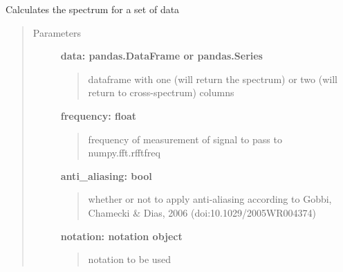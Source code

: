 \documentclass[a4paper,10pt,english]{sphinxmanual}
\begin{document}
\begin{fulllineitems}
\label{pymicra:pymicra.data.crossSpectra}
Calculates the spectrum for a set of data
\begin{quote}\begin{description}
\item[{Parameters}] \leavevmode
\textbf{data: pandas.DataFrame or pandas.Series}
\begin{quote}

dataframe with one (will return the spectrum) or two (will return to cross-spectrum) columns
\end{quote}

\textbf{frequency: float}
\begin{quote}

frequency of measurement of signal to pass to numpy.fft.rfftfreq
\end{quote}

\textbf{anti\_aliasing: bool}
\begin{quote}

whether or not to apply anti-aliasing according to Gobbi, Chamecki \& Dias, 2006 (doi:10.1029/2005WR004374)
\end{quote}

\textbf{notation: notation object}
\begin{quote}

notation to be used
\end{quote}

\end{description}\end{quote}

\end{fulllineitems}

\end{document}
